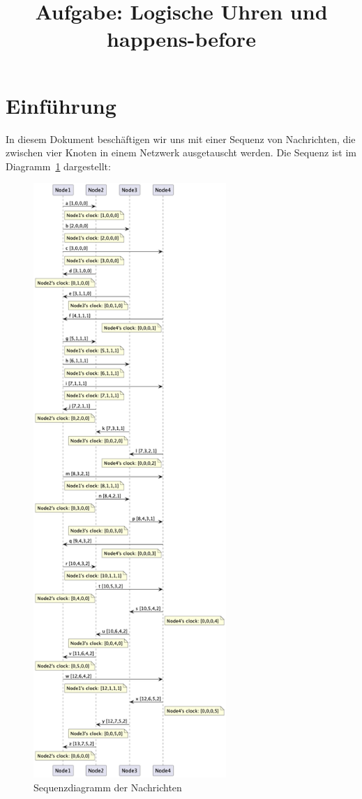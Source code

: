 \documentclass{article}
\begin{document}
\title{Aufgabe: Logische Uhren und happens-before}
\maketitle

\section{Einführung}
In diesem Dokument beschäftigen wir uns mit einer Sequenz von Nachrichten, die zwischen vier Knoten in einem Netzwerk ausgetauscht werden. Die Sequenz ist im Diagramm~\ref{fig:sequenzdiagramm} dargestellt:

\begin{figure}[h]
\centering
\includegraphics[width=0.65\textwidth]{../../fig/uml/clock_exam_concurrent.png}
\caption{Sequenzdiagramm der Nachrichten}
\label{fig:sequenzdiagramm}
\end{figure}
\end{document}
